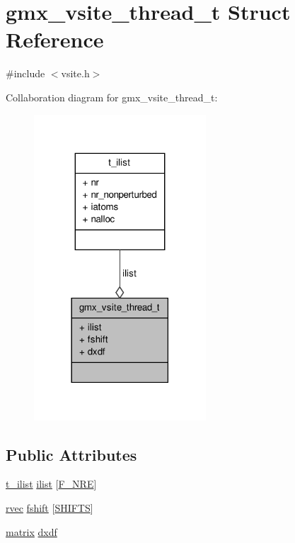 \hypertarget{structgmx__vsite__thread__t}{\section{gmx\-\_\-vsite\-\_\-thread\-\_\-t \-Struct \-Reference}
\label{structgmx__vsite__thread__t}
}


{\ttfamily \#include $<$vsite.\-h$>$}



\-Collaboration diagram for gmx\-\_\-vsite\-\_\-thread\-\_\-t\-:
\nopagebreak
\begin{figure}[H]
\begin{center}
\leavevmode
\includegraphics[width=182pt]{structgmx__vsite__thread__t__coll__graph}
\end{center}
\end{figure}
\subsection*{\-Public \-Attributes}
\begin{DoxyCompactItemize}
\item 
\hyperlink{structt__ilist}{t\-\_\-ilist} \hyperlink{structgmx__vsite__thread__t_ad27956a6f0d872b2050ac37de6931ccf}{ilist} \mbox{[}\hyperlink{share_2template_2gromacs_2types_2idef_8h_aa52ea6a123f47db5e6b145e5fc5e369aa619bce9d967702fd746289c3f61269f2}{\-F\-\_\-\-N\-R\-E}\mbox{]}
\item 
\hyperlink{share_2template_2gromacs_2types_2simple_8h_aa02a552a4abd2f180c282a083dc3a999}{rvec} \hyperlink{structgmx__vsite__thread__t_a506da294a614f1e8b2b02bc3a6934049}{fshift} \mbox{[}\hyperlink{share_2template_2gromacs_2types_2ishift_8h_a19efb0358d81bdc7dc2ed90c16ac84b0}{\-S\-H\-I\-F\-T\-S}\mbox{]}
\item 
\hyperlink{share_2template_2gromacs_2types_2simple_8h_a7ea9c2a830d3f743b887387e33645a83}{matrix} \hyperlink{structgmx__vsite__thread__t_a038e66c7022bdd502fb7e2f286778bec}{dxdf}
\end{DoxyCompactItemize}


